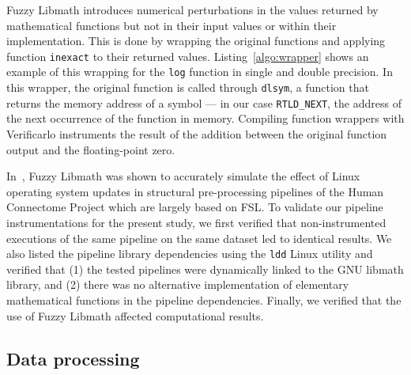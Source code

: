 \documentclass[11pt,onecolumn]{article}
\begin{document}
Fuzzy Libmath introduces numerical perturbations in the values returned by
mathematical functions but not in their input values or within their
implementation. This is done by wrapping the original functions and
applying function \texttt{inexact} to their returned values.
Listing~\ref{algo:wrapper} shows an example of this wrapping for the
\texttt{log} function in single and double precision. In this wrapper, the
original function is called through \texttt{dlsym}, a function that returns
the memory address of a symbol --- in our case \texttt{RTLD\_NEXT}, the
address of the next occurrence of the function in memory. Compiling function wrappers
with Verificarlo instruments the result of the
addition between the original function output and the floating-point zero.



In~\cite{salari2021accurate}, Fuzzy Libmath was shown to accurately
simulate the effect of Linux operating system updates in structural
pre-processing pipelines of the Human Connectome Project which are largely based on FSL.
To validate our pipeline instrumentations for the present study, we first verified that non-instrumented
executions of the same pipeline on the same dataset led to identical
results. We also listed the pipeline
library dependencies using the \texttt{ldd} Linux utility and verified that
(1) the tested pipelines were dynamically linked to the GNU libmath library, and
(2) there was no alternative implementation of elementary mathematical functions in the pipeline dependencies.
Finally, we verified that the use of Fuzzy Libmath affected computational results.

\subsection{Data processing}
\end{document}
